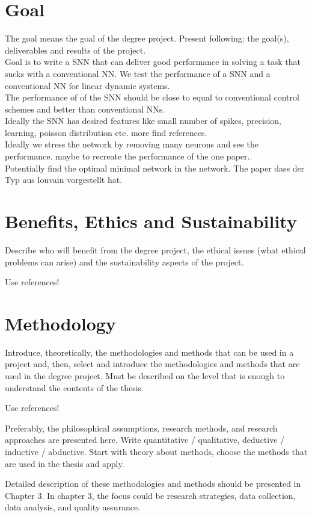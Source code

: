 \section{Goal}
The goal means the goal of the degree project. Present following: the goal(s), deliverables and results of the project.\\
Goal is to write a SNN that can deliver good performance in solving a task that sucks with a conventional NN.
We test the performance of a SNN and a conventional NN for linear dynamic systems.\\
The performance of of the SNN should be close to equal to conventional control schemes and better than conventional NNs.\\
Ideally the SNN has desired features like small number of spikes, precision, learning, poisson distribution etc. more find references.\\
Ideally we stress the network by removing many neurons and see the performance. maybe to recreate the performance of the one paper.. \\
Potentially find the optimal minimal network in the network. The paper dass der Typ aus louvain vorgestellt hat.
\section{Benefits, Ethics and Sustainability}
Describe who will benefit from the degree project, the ethical issues (what ethical problems can arise) and the sustainability aspects of the project.

Use references!

\section{Methodology}
Introduce, theoretically, the methodologies and methods that can be used in a project and, then, select and introduce the methodologies and methods that are used in the degree project. Must be described on the level that is enough to understand the contents of the thesis.

Use references!

Preferably, the philosophical assumptions, research methods, and research approaches are presented here. Write quantitative / qualitative, deductive / inductive / abductive. Start with theory about methods, choose the methods that are used in the thesis and apply.


Detailed description of these methodologies and methods should be presented in Chapter 3. In chapter 3, the focus could be research strategies, data collection, data analysis, and quality assurance.


